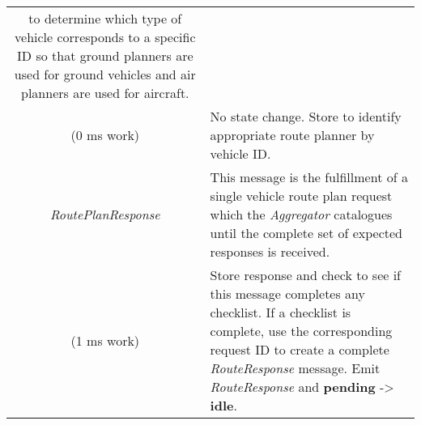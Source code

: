 \begin{longtable}[]{@{}cl@{}}
\begin{minipage}[t]{0.55\columnwidth}
to determine which type of vehicle corresponds to a specific ID so that
ground planners are used for ground vehicles and air planners are used
for aircraft.\strut
\end{minipage}\tabularnewline
\begin{minipage}[t]{0.40\columnwidth}\centering\strut
(0 ms work)\strut
\end{minipage} & \begin{minipage}[t]{0.55\columnwidth}\raggedright\strut
No state change. Store to identify appropriate route planner by vehicle
ID.\strut
\end{minipage}\tabularnewline
\begin{minipage}[t]{0.40\columnwidth}\centering\strut
\emph{RoutePlanResponse}\strut
\end{minipage} & \begin{minipage}[t]{0.55\columnwidth}\raggedright\strut
This message is the fulfillment of a single vehicle route plan request
which the \emph{Aggregator} catalogues until the complete set of
expected responses is received.\strut
\end{minipage}\tabularnewline
\begin{minipage}[t]{0.40\columnwidth}\centering\strut
(1 ms work)\strut
\end{minipage} & \begin{minipage}[t]{0.55\columnwidth}\raggedright\strut
Store response and check to see if this message completes any checklist.
If a checklist is complete, use the corresponding request ID to create a
complete \emph{RouteResponse} message. Emit \emph{RouteResponse} and
\textbf{pending} -\textgreater{} \textbf{idle}.\strut
\end{minipage}\tabularnewline
\bottomrule
\end{longtable}

